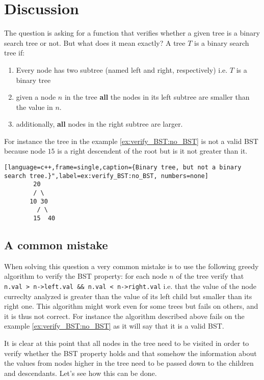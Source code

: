 \section{Discussion}
\label{verify_BST:sec:discussion}
The question is asking for a function that verifies whether a given tree is a binary search tree or not. But what does it mean exactly?
A tree $T$ is a binary search tree if:
\begin{enumerate}
	\item Every node has two subtree (named left and right, respectively) i.e. $T$ is a binary tree
	\item given a node $n$ in the tree \textbf{all} the nodes in its left subtree are smaller than the value in $n$.
	\item additionally,  \textbf{all} nodes in the right subtree are larger.
\end{enumerate}
For instance the tree in the example \ref{ex:verify_BST:no_BST} is not a valid BST because node $15$ is a right descendent of the root but is it not greater than it. 
\begin{lstlisting}[language=c++,frame=single,caption={Binary tree, but not a binary search tree.}",label=ex:verify_BST:no_BST, numbers=none]
	    20
	    / \
	   10 30
	     / \
	    15  40
\end{lstlisting}


\subsection{A common mistake}
When solving this question a very common mistake is to use the following greedy algorithm to verify the BST property: for each node $n$ of the tree verify that \lstinline[columns=fixed]{n.val > n->left.val && n.val < n->right.val} i.e. that the value of the node curreclty analyzed is greater than the value of its left child but smaller than its right one. This algorithm might work even for some trees but fails on others, and it is thus not correct. For instance the algorithm described above fails on the example \ref{ex:verify_BST:no_BST} as it will say that it is a valid BST.

It is clear at this point that all nodes in the tree need to be visited in order to verify whether the BST property holds and that somehow the information about the values from nodes higher in the tree need to be passed down to the children and descendants. Let's see how this can be done.

